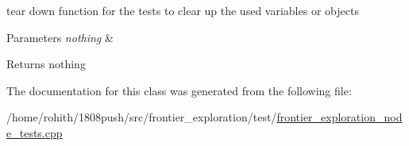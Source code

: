 tear down function for the tests to clear up the used variables or objects 


\begin{DoxyParams}{Parameters}
{\em nothing} & \\
\hline
\end{DoxyParams}
\begin{DoxyReturn}{Returns}
nothing 
\end{DoxyReturn}


The documentation for this class was generated from the following file\+:\begin{DoxyCompactItemize}
\item 
/home/rohith/1808push/src/frontier\+\_\+exploration/test/\hyperlink{frontier__exploration__node__tests_8cpp}{frontier\+\_\+exploration\+\_\+node\+\_\+tests.\+cpp}\end{DoxyCompactItemize}
